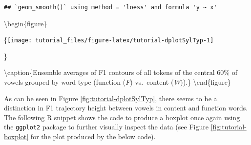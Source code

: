 \documentclass[]{book}
\newenvironment{Shaded}{\begin{snugshade}}{\end{snugshade}}
\newcommand{\CommentTok}[1]{\textcolor[rgb]{0.56,0.35,0.01}{\textit{#1}}}
\newcommand{\DataTypeTok}[1]{\textcolor[rgb]{0.13,0.29,0.53}{#1}}
\newcommand{\FloatTok}[1]{\textcolor[rgb]{0.00,0.00,0.81}{#1}}
\newcommand{\KeywordTok}[1]{\textcolor[rgb]{0.13,0.29,0.53}{\textbf{#1}}}
\newcommand{\NormalTok}[1]{#1}
\newcommand{\OperatorTok}[1]{\textcolor[rgb]{0.81,0.36,0.00}{\textbf{#1}}}
\newcommand{\StringTok}[1]{\textcolor[rgb]{0.31,0.60,0.02}{#1}}
\theoremstyle{definition}
\theoremstyle{definition}
\theoremstyle{definition}
\theoremstyle{remark}
\begin{document}
\begin{Shaded}
\end{Shaded}

\begin{verbatim}
## `geom_smooth()` using method = 'loess' and formula 'y ~ x'
\end{verbatim}

\textbackslash{}begin\{figure\}

\{\centering \texttt{[image: tutorial\_files/figure-latex/tutorial-dplotSylTyp-1]}

\}

\textbackslash{}caption\{Ensemble averages of F1 contours of all tokens
of the central 60\% of vowels grouped by word type (function (\emph{F})
vs.~content (\emph{W})).\}\label{fig:tutorial-dplotSylTyp}
\textbackslash{}end\{figure\}

As can be seen in Figure \ref{fig:tutorial-dplotSylTyp}, there seems to
be a distinction in F1 trajectory height between vowels in content and
function words. The following R snippet shows the code to produce a
boxplot once again using the \texttt{ggplot2} package to further
visually inspect the data (see Figure \ref{fig:tutorial-boxplot} for the
plot produced by the below code).
\end{document}
